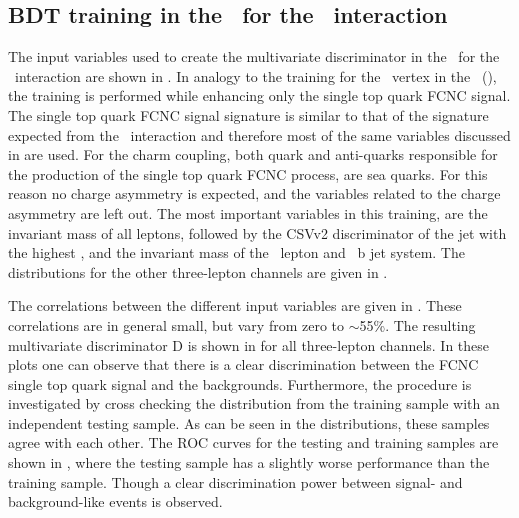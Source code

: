 \clearpage	
\subsection{BDT training in the \STSR\ for the \Zct\ interaction}
\label{sec:BDTSTSRZCT}
The input variables used to create the multivariate discriminator in the \STSR\ for the \Zct\ interaction are shown in . In analogy to the training for the \Zut\ vertex in the \STSR\ (), the training is performed while enhancing only the single top quark FCNC signal. The single top quark FCNC  signal signature is similar to that of the signature expected from the \Zut\ interaction and therefore most of the same variables discussed in  are used. For the charm coupling, both quark and anti-quarks responsible for the production of the single top quark FCNC process, are sea quarks. For this reason no charge asymmetry is expected, and the variables related to the charge asymmetry are left out.
 The most important variables in this training,  are the invariant mass of all leptons,  followed by the CSVv2 discriminator of the jet with the highest \pt, and the invariant mass of the \PW\ lepton and \SM\ b jet system. The distributions for the other three-lepton channels are given in .
 
 
The correlations between the different input variables are given in . These correlations are in general small, but vary from zero to $\sim$55\%.
The resulting multivariate discriminator D is shown in  for all three-lepton channels. In these plots one can observe that there is a clear discrimination between the FCNC single top quark signal and the backgrounds. Furthermore, the procedure is investigated by cross checking the distribution from the training sample with an independent testing sample. As can be seen in the distributions, these samples agree with each other. The ROC curves for the testing and training samples are shown in , where the testing sample has a slightly worse performance than the training sample. Though a clear discrimination power between signal- and background-like events is observed. 

